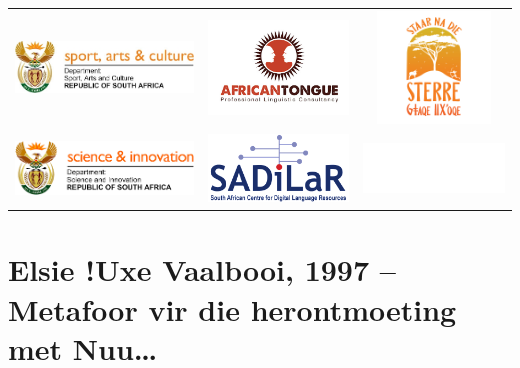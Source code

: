 \begin{tabular}{lcc}
    \includegraphics[width=6.3cm]{dsac.jpg} &
    \includegraphics[width=5cm]{at.jpg} &
    \includegraphics[width=3cm]{sterre.png} \\
    \includegraphics[width=6cm]{dsi.png} &
    \includegraphics[width=5cm]{sadilar.png} &
    \includegraphics[width=5cm]{solid-color-image.jpeg} \\
\end{tabular}

\newpage



\section*{Elsie !Uxe Vaalbooi, 1997 -- Metafoor vir die herontmoeting met
N\textipa{\textvertline}uu\ldots}

